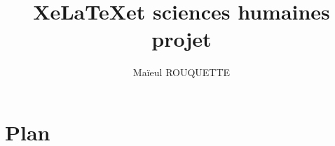\documentclass[a4paper,11pt]{book}
\begin{document}
\title{Xe\LaTeX et sciences humaines \\ projet}
\author{Maïeul ROUQUETTE}
\date{}
\maketitle
\chapter{Plan}
%
%
%



\end{document}
